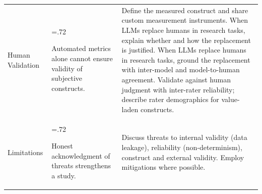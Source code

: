 \documentclass[smallextended]{svjour3}
\newcommand{\must}{\textbf{must}\xspace}
\newcommand{\should}{\textbf{should}\xspace}
\newcommand{\iconM}{\usebox{\iconMbox}\xspace}
\newcommand{\iconS}{\usebox{\iconSbox}\xspace}
\newcommand{\iconM}{●\xspace}
\newcommand{\iconS}{○\xspace}
\begin{document}
\begin{appendices}
\begin{center}
\begin{tabularx}{\textwidth}{@{}>{\raggedright\arraybackslash}p{2.05cm}>{\hsize=.72\hsize\raggedright\arraybackslash}X>{\hsize=1.28\hsize\raggedright\arraybackslash}X@{}}
Human Validation & Automated metrics alone cannot ensure validity of subjective constructs. &
\iconM Define the measured construct and share custom measurement instruments.
\newline \iconM When LLMs replace humans in research tasks, explain whether and how the replacement is justified.
\newline \iconS When LLMs replace humans in research tasks, ground the replacement with inter-model and model-to-human agreement.
\newline \iconS Validate against human judgment with inter-rater reliability; describe rater demographics for value-laden constructs. \\
\addlinespace
Limitations & Honest acknowledgment of threats strengthens a study. &
\iconM Discuss threats to internal validity (data leakage), reliability (non-determinism), construct and external validity.
\newline \iconS Employ mitigations where possible. \\
\bottomrule
\end{tabularx}
\end{center}
\space%


\end{appendices}
\end{document}

